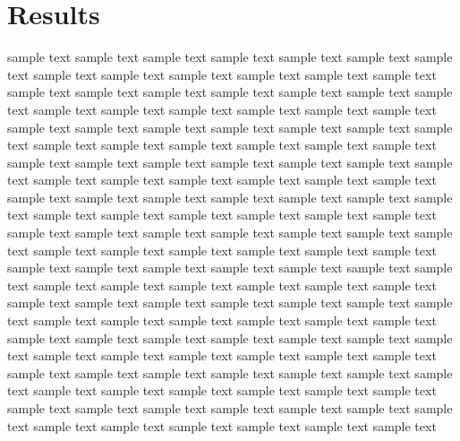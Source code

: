 \section{Results}
sample text sample text sample text sample text sample text sample text sample
text sample text sample text sample text sample text sample text sample text
sample text sample text sample text sample text sample text sample text sample
text sample text sample text sample text sample text sample text sample text
sample text sample text sample text sample text sample text sample text sample
text sample text sample text sample text sample text sample text sample text
sample text sample text sample text sample text sample text sample text sample
text sample text sample text sample text sample text sample text sample text
sample text sample text sample text sample text sample text sample text sample
text sample text sample text sample text sample text sample text sample text
sample text sample text sample text sample text sample text sample text sample
text sample text sample text sample text sample text sample text sample text
sample text sample text sample text sample text sample text sample text sample
text sample text sample text sample text sample text sample text sample text
sample text sample text sample text sample text sample text sample text sample
text sample text sample text sample text sample text sample text sample text
sample text sample text sample text sample text sample text sample text sample
text sample text sample text sample text sample text sample text sample text
sample text sample text sample text sample text sample text sample text sample
text sample text sample text sample text sample text sample text sample text
sample text sample text sample text sample text sample text sample text sample
text sample text sample text sample text sample text sample text sample text

